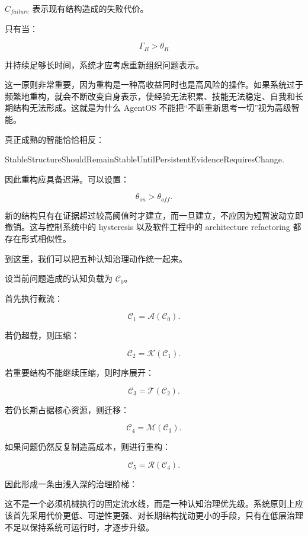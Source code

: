 $C_{failure}$ 表示现有结构造成的失败代价。

只有当：

\[
\Gamma_R>\theta_R
\]

并持续足够长时间，系统才应考虑重新组织问题表示。

这一原则非常重要，因为重构是一种高收益同时也是高风险的操作。如果系统过于频繁地重构，就会不断改变自身表示，使经验无法积累、技能无法稳定、自我和长期结构无法形成。这就是为什么 AgentOS 不能把“不断重新思考一切”视为高级智能。

真正成熟的智能恰恰相反：

\begin{statementbox}
StableStructureShouldRemainStableUntilPersistentEvidenceRequiresChange.
\end{statementbox}

因此重构应具备迟滞。可以设置：

\[
\theta_{on}
>
\theta_{off}.
\]

新的结构只有在证据超过较高阈值时才建立，而一旦建立，不应因为短暂波动立即撤销。这与控制系统中的 hysteresis 以及软件工程中的 architecture refactoring 都存在形式相似性。

到这里，我们可以把五种认知治理动作统一起来。

设当前问题造成的认知负载为 $\mathcal C_0$。

首先执行截流：

\[
\mathcal C_1
=
\mathcal A(\mathcal C_0).
\]

若仍超载，则压缩：

\[
\mathcal C_2
=
\mathcal K(\mathcal C_1).
\]

若重要结构不能继续压缩，则时序展开：

\[
\mathcal C_3
=
\mathcal T(\mathcal C_2).
\]

若仍长期占据核心资源，则迁移：

\[
\mathcal C_4
=
\mathcal M(\mathcal C_3).
\]

如果问题仍然反复制造高成本，则进行重构：

\[
\mathcal C_5
=
\mathcal R(\mathcal C_4).
\]

因此形成一条由浅入深的治理阶梯：

\begin{statementbox}
\centering
{}
\end{statementbox}

这不是一个必须机械执行的固定流水线，而是一种认知治理优先级。系统原则上应该首先采用代价更低、可逆性更强、对长期结构扰动更小的手段，只有在低层治理不足以保持系统可运行时，才逐步升级。

